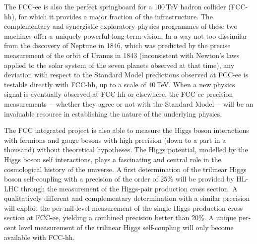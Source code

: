 The FCC-ee is also the perfect springboard for a 100\,TeV hadron collider (FCC-hh), for which it provides a major fraction of the infrastructure. The complementary and synergistic exploratory physics programmes of these two machines offer a uniquely powerful long-term vision. In a way not too dissimilar from the discovery of Neptune in 1846, which was predicted by the precise measurement of the orbit of Uranus in 1843 (inconsistent with Newton's laws applied to the solar system of the seven planets observed at that time), any deviation with respect to the Standard Model predictions observed at FCC-ee is testable directly with FCC-hh, up to a scale of 40\,TeV. When a new physics signal is eventually observed at FCC-hh or elsewhere, the FCC-ee precision measurements ---whether they agree or not with the Standard Model--- will be an invaluable resource in establishing the nature of the underlying physics. 

The FCC integrated project is also able to measure the Higgs boson interactions with fermions and gauge bosons with high precision (down to a part in a thousand) without theoretical hypotheses. 
The Higgs potential, modelled by the Higgs boson self interactions, plays a fascinating and central role in the cosmological history of the universe. A first determination of the trilinear Higgs boson self-coupling with a precision of the order of 25\% will be provided by HL-LHC through the measurement of the Higgs-pair production cross section. A qualitatively different and complementary determination with a similar precision will exploit the per-mil-level 
measurement of the single-Higgs production cross section at FCC-ee, yielding a combined precision better than 20\%. A unique per-cent level measurement of the trilinear Higgs self-coupling will only become available with FCC-hh.


